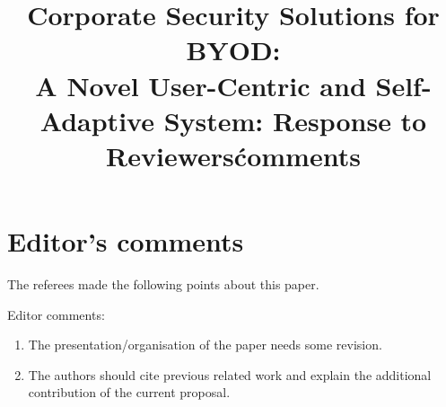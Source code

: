 \documentclass[preprint]{elsarticle}
\begin{document}

\title{Corporate Security Solutions for BYOD:\\ A Novel User-Centric and Self-Adaptive System: Response to Reviewers\' comments}

\section{Editor's comments}
The referees made the following points about this paper.

Editor comments:\begin{enumerate}
\item The presentation/organisation of the paper needs some revision.
\item The authors should cite previous related work and explain the
  additional contribution of the current proposal.
\end{enumerate}
\end{document}
